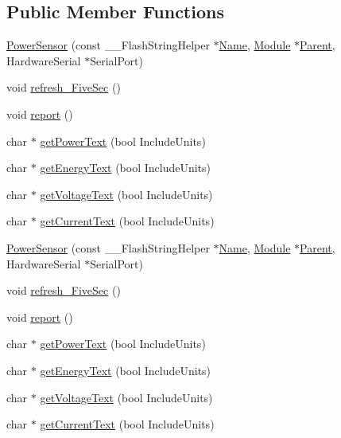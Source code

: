 \subsection*{Public Member Functions}
\begin{DoxyCompactItemize}
\item 
\hyperlink{class_power_sensor_ac075e36efa8d0786590a7a2179f22520}{Power\+Sensor} (const \+\_\+\+\_\+\+Flash\+String\+Helper $\ast$\hyperlink{class_common_aeea91a726dbe988e515057b32ba0726f}{Name}, \hyperlink{class_module}{Module} $\ast$\hyperlink{class_power_sensor_aec7f26ccc5882e626f4dd6fa0f4729bb}{Parent}, Hardware\+Serial $\ast$Serial\+Port)
\item 
void \hyperlink{class_power_sensor_a429859d5aa4b72bac2002cda95ac5b21}{refresh\+\_\+\+Five\+Sec} ()
\item 
void \hyperlink{class_power_sensor_a3cbd46c601175cfe32bb12b9205b0e10}{report} ()
\item 
char $\ast$ \hyperlink{class_power_sensor_ad1544079a0a3b7eafbb02411a2553cff}{get\+Power\+Text} (bool Include\+Units)
\item 
char $\ast$ \hyperlink{class_power_sensor_a20b1412111d88dbf9ec19b1716dadb11}{get\+Energy\+Text} (bool Include\+Units)
\item 
char $\ast$ \hyperlink{class_power_sensor_a168a4f9e8ea56397b1d67889ce3575b6}{get\+Voltage\+Text} (bool Include\+Units)
\item 
char $\ast$ \hyperlink{class_power_sensor_ac3795cfd4910157ca6046272d53cab1f}{get\+Current\+Text} (bool Include\+Units)
\item 
\hyperlink{class_power_sensor_ac075e36efa8d0786590a7a2179f22520}{Power\+Sensor} (const \+\_\+\+\_\+\+Flash\+String\+Helper $\ast$\hyperlink{class_common_aeea91a726dbe988e515057b32ba0726f}{Name}, \hyperlink{class_module}{Module} $\ast$\hyperlink{class_power_sensor_aec7f26ccc5882e626f4dd6fa0f4729bb}{Parent}, Hardware\+Serial $\ast$Serial\+Port)
\item 
void \hyperlink{class_power_sensor_a429859d5aa4b72bac2002cda95ac5b21}{refresh\+\_\+\+Five\+Sec} ()
\item 
void \hyperlink{class_power_sensor_a3cbd46c601175cfe32bb12b9205b0e10}{report} ()
\item 
char $\ast$ \hyperlink{class_power_sensor_ae7d0b6b4b823cea31b7958cae583ed69}{get\+Power\+Text} (bool Include\+Units)
\item 
char $\ast$ \hyperlink{class_power_sensor_a047668dfa417e539e6e28913b1f8737b}{get\+Energy\+Text} (bool Include\+Units)
\item 
char $\ast$ \hyperlink{class_power_sensor_a571613e04e60736e92547eed90ee17e3}{get\+Voltage\+Text} (bool Include\+Units)
\item 
char $\ast$ \hyperlink{class_power_sensor_a44f7097631cdbaf30cfbc210ea18ff6a}{get\+Current\+Text} (bool Include\+Units)
\end{DoxyCompactItemize}
